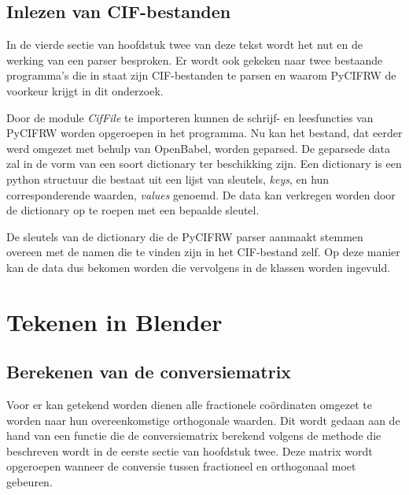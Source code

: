 \subsection{Inlezen van CIF-bestanden}
In de vierde sectie van hoofdstuk twee van deze tekst wordt het nut en de werking van een parser besproken. Er wordt ook gekeken naar twee bestaande programma's die in staat zijn CIF-bestanden te parsen en waarom PyCIFRW de voorkeur krijgt in dit onderzoek.
\par
Door de module \textit{CifFile} te importeren kunnen de schrijf- en leesfuncties van PyCIFRW worden opgeroepen in het programma. Nu kan het bestand, dat eerder werd omgezet met behulp van OpenBabel, worden geparsed. De geparsede data zal in de vorm van een soort dictionary ter beschikking zijn. Een dictionary is een python structuur die bestaat uit een lijst van sleutels, \textit{keys}, en hun corresponderende waarden, \textit{values} genoemd. De data kan verkregen worden door de dictionary op te roepen met een bepaalde sleutel.
\par
De sleutels van de dictionary die de PyCIFRW parser aanmaakt stemmen overeen met de namen die te vinden zijn in het CIF-bestand zelf. Op deze manier kan de data dus bekomen worden die vervolgens in de klassen worden ingevuld.

\section{Tekenen in Blender}
\subsection{Berekenen van de conversiematrix}
Voor er kan getekend worden dienen alle fractionele coördinaten omgezet te worden  naar hun overeenkomstige orthogonale waarden. Dit wordt gedaan aan de hand van een functie die de conversiematrix berekend volgens de methode die beschreven wordt in de eerste sectie van hoofdstuk twee. Deze matrix wordt opgeroepen wanneer de conversie tussen fractioneel en orthogonaal moet gebeuren.

